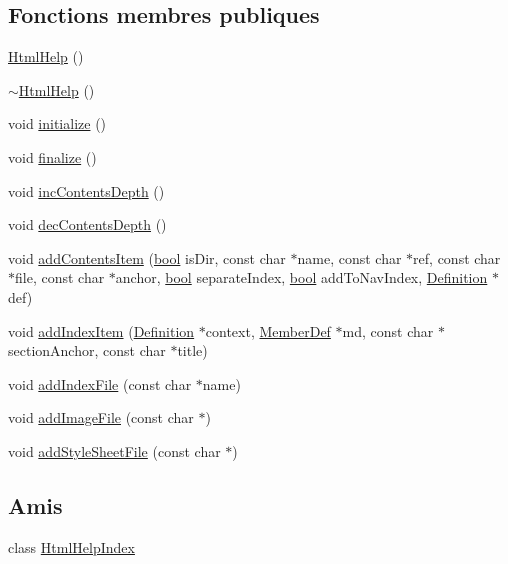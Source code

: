 \subsection*{Fonctions membres publiques}
\begin{DoxyCompactItemize}
\item 
\hyperlink{class_html_help_a0d86f84971a446fc8c61c1a64f8eaaf8}{Html\+Help} ()
\item 
\hyperlink{class_html_help_a53ff23898ba7e49de5ce6dba03675f82}{$\sim$\+Html\+Help} ()
\item 
void \hyperlink{class_html_help_acf6cb7c477c71f2031b5831f979991d5}{initialize} ()
\item 
void \hyperlink{class_html_help_a66375adceef242d73c6554bd7fba6cf7}{finalize} ()
\item 
void \hyperlink{class_html_help_aca0008f8813f28f23ca5bcaea25a7bec}{inc\+Contents\+Depth} ()
\item 
void \hyperlink{class_html_help_ad76b300748e818d96676f0743738090d}{dec\+Contents\+Depth} ()
\item 
void \hyperlink{class_html_help_a254ac391f0b096f1c06b72205fca5d77}{add\+Contents\+Item} (\hyperlink{qglobal_8h_a1062901a7428fdd9c7f180f5e01ea056}{bool} is\+Dir, const char $\ast$name, const char $\ast$ref, const char $\ast$file, const char $\ast$anchor, \hyperlink{qglobal_8h_a1062901a7428fdd9c7f180f5e01ea056}{bool} separate\+Index, \hyperlink{qglobal_8h_a1062901a7428fdd9c7f180f5e01ea056}{bool} add\+To\+Nav\+Index, \hyperlink{class_definition}{Definition} $\ast$def)
\item 
void \hyperlink{class_html_help_a547f7caa925db6b0f227176c695bd687}{add\+Index\+Item} (\hyperlink{class_definition}{Definition} $\ast$context, \hyperlink{class_member_def}{Member\+Def} $\ast$md, const char $\ast$section\+Anchor, const char $\ast$title)
\item 
void \hyperlink{class_html_help_a713ba33425a3d63c89322cc513e01414}{add\+Index\+File} (const char $\ast$name)
\item 
void \hyperlink{class_html_help_aba0ad9a05caf2ff7c310aaf751eb22e9}{add\+Image\+File} (const char $\ast$)
\item 
void \hyperlink{class_html_help_a711b8605fb3b450234299747b5675a0b}{add\+Style\+Sheet\+File} (const char $\ast$)
\end{DoxyCompactItemize}
\subsection*{Amis}
\begin{DoxyCompactItemize}
\item 
class \hyperlink{class_html_help_a6ba39d6a831c897c93a68738d9a721f3}{Html\+Help\+Index}
\end{DoxyCompactItemize}


